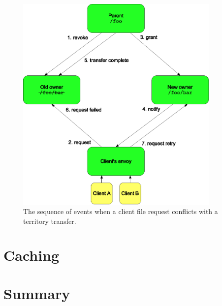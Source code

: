 \begin{figure}[tp]
\centering
\includegraphics[width=100mm]{figures/migrate-sync}
\caption{The sequence of events when a client file request conflicts with a territory transfer.}
\label{fig:migrate-sync}
\end{figure}

\section{Caching}

\section{Summary}